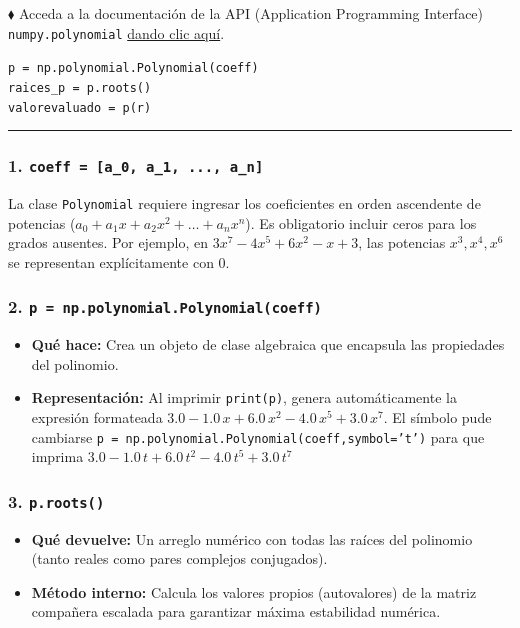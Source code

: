 \documentclass[12pt]{article}
\begin{document}
\begin{cajaflex}

$\blacklozenge$ Acceda a la documentación de la API (Application Programming Interface) \lstinline|numpy.polynomial| 
\href{https://numpy.org/doc/stable/reference/generated/numpy.polynomial.polynomial.Polynomial.html}{dando clic aquí}. 


\lstinline|p = np.polynomial.Polynomial(coeff)| \quad \hfill {} \\
\lstinline|raices_p = p.roots()| \quad \hfill {} \\
\lstinline|valorevaluado = p(r)| \quad \hfill {}

\textcolor{teal!60!black}{\rule{\linewidth}{0.8pt}}

\vspace{0.1cm}

\subsubsection*{\textcolor{teal!70!black}{1. \texttt{coeff = [a\_0, a\_1, ..., a\_n]}}}
La clase \texttt{Polynomial}  requiere ingresar los coeficientes en orden ascendente de 
potencias ($a_0 + a_1 x + a_2 x^2 + \dots + a_n x^n$).
Es obligatorio incluir ceros para los grados ausentes. 
Por ejemplo, en $3x^7 - 4x^5 + 6x^2 - x + 3$, las potencias $x^3, x^4, x^6$ 
se representan explícitamente con $0$.


\subsubsection*{\textcolor{teal!70!black}{2. \texttt{p = np.polynomial.Polynomial(coeff)}}}
\begin{itemize}
    \item \textbf{Qué hace:} Crea un objeto de clase algebraica que encapsula las propiedades 
    del polinomio.
    \item \textbf{Representación:} 
    Al imprimir \texttt{print(p)}, genera automáticamente la expresión 
    formateada $3.0 - 1.0\,x + 6.0\,x^2 - 4.0\,x^5 + 3.0\,x^7$.  El símbolo pude cambiarse
    \texttt{p = np.polynomial.Polynomial(coeff,symbol='t')} para que imprima
    $3.0 - 1.0\,t + 6.0\,t^2 - 4.0\,t^5 + 3.0\,t^7$
\end{itemize}

\subsubsection*{\textcolor{teal!70!black}{3. \texttt{p.roots()}}}
\begin{itemize}
    \item \textbf{Qué devuelve:} Un arreglo numérico con todas las raíces del polinomio (tanto reales como pares complejos conjugados).
    \item \textbf{Método interno:} Calcula los valores propios (autovalores) de la matriz compañera escalada para garantizar máxima estabilidad numérica.
\end{itemize}


\end{cajaflex}
\end{document}
